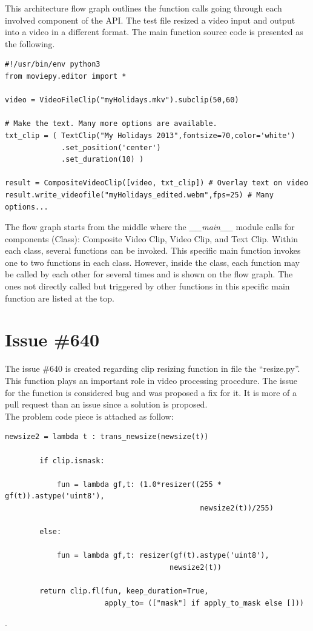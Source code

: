\documentclass[a4paper, 11pt]{article}
\begin{document}
This architecture flow graph outlines the function calls going through each involved component of the API. The test file resized a video input and output into a video in a different format. The main function source code is presented as the following.

\begin{lstlisting}
#!/usr/bin/env python3
from moviepy.editor import *

video = VideoFileClip("myHolidays.mkv").subclip(50,60)

# Make the text. Many more options are available.
txt_clip = ( TextClip("My Holidays 2013",fontsize=70,color='white')
             .set_position('center')
             .set_duration(10) )

result = CompositeVideoClip([video, txt_clip]) # Overlay text on video
result.write_videofile("myHolidays_edited.webm",fps=25) # Many options...
\end{lstlisting}

The flow graph starts from the middle where the \textit{\_\_main\_\_} module calls for components (Class): Composite Video Clip, Video Clip, and Text Clip. Within each class, several functions can be invoked. This specific main function invokes one to two functions in each class. However, inside the class, each function may be called by each other for several times and is shown on the flow graph. The ones not directly called but triggered by other functions in this specific main function are listed at the top.


\section{Issue \#640}
The issue \#640 is created regarding clip resizing function in file the ``resize.py''. This function plays an important role in video processing procedure. The issue for the function is considered bug and was proposed a fix for it. It is more of a pull request than an issue since a solution is proposed. \\

The problem code piece is attached as follow:

\begin{lstlisting}
newsize2 = lambda t : trans_newsize(newsize(t))

        if clip.ismask:

            fun = lambda gf,t: (1.0*resizer((255 * gf(t)).astype('uint8'),
                                             newsize2(t))/255)

        else:

            fun = lambda gf,t: resizer(gf(t).astype('uint8'),
                                      newsize2(t))

        return clip.fl(fun, keep_duration=True,
                       apply_to= (["mask"] if apply_to_mask else []))
\end{lstlisting}.
\end{document}
